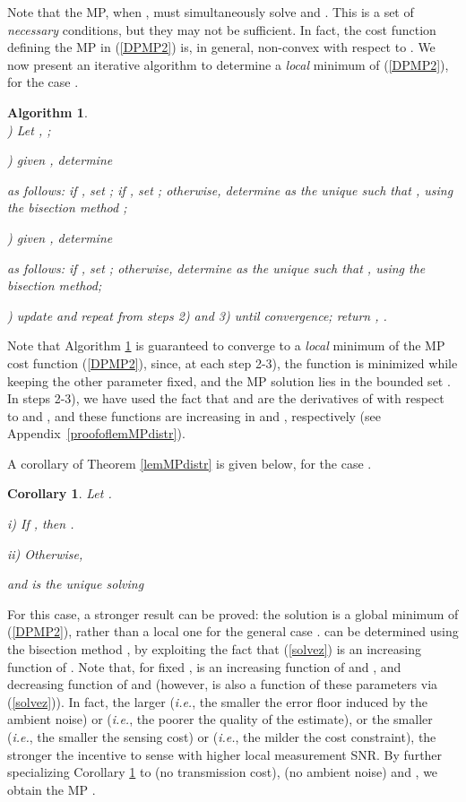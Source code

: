 \documentclass[10pt,twocolumn,twoside]{IEEEtran}
\newtheorem{corol}{Corollary}
\newtheorem{algo}{Algorithm}
\theoremstyle{plain}
\begin{document}
 Note that the MP, when , must simultaneously solve
   and 
 . This is a set of \emph{necessary} conditions, but they may not be sufficient.
 In fact, the cost function defining the MP in (\ref{DPMP2}) is, in general, non-convex with respect to .
 We now present an iterative algorithm to determine a \emph{local} minimum of (\ref{DPMP2}), for the case .
 \vspace{-3mm}
 \begin{algo}\label{algoMP}\\
) Let , ;

) given , determine

as follows: if , set ;
if , set ;
otherwise, determine  as the unique 
  such that , using the \emph{bisection method} \cite{bisection};
 
) given , determine

as follows: if , set ;
otherwise, determine  as the unique 
  such that , using the \emph{bisection method};

) update  and repeat from steps 2) and 3) until convergence; return ,
.
\end{algo}
Note that Algorithm \ref{algoMP} is guaranteed to converge to a \emph{local} minimum of the MP cost function (\ref{DPMP2}),
since, at each step 2-3), the function  is minimized while keeping the other parameter fixed, and
 the MP solution  lies in the bounded set .
In steps 2{-}3), we have used the fact that  and 
are the derivatives of   with respect to  and ,
and these functions are increasing in  and , respectively (see Appendix~\ref{proofoflemMPdistr}).

A corollary of Theorem \ref{lemMPdistr} is given below, for the case .
\begin{corol}
\label{sdfsdf}
Let .

\noindent \emph{i)} If ,
then .

\noindent \emph{ii)} 
Otherwise, 

and  is the unique  solving

\end{corol}
For this case, a stronger result can be proved: the solution is a global minimum of (\ref{DPMP2}), rather than a local one for the general case .
  can be determined using the bisection method \cite{bisection},
 by exploiting the fact that (\ref{solvez}) is an increasing function of .
 Note that, for fixed ,  is an increasing function of  and , and decreasing function of 
  and  (however,  is also a function of these parameters via (\ref{solvez})). In fact, the larger  (\emph{i.e.}, the smaller the
 error floor induced by the ambient noise) or
  (\emph{i.e.}, the poorer the quality of the estimate),
 or the smaller  (\emph{i.e.}, the smaller the sensing cost) or  (\emph{i.e.}, the milder the cost constraint),
 the stronger the incentive to sense with higher local measurement SNR.
By further specializing Corollary \ref{sdfsdf} to  (no transmission cost),  (no ambient noise) and , we obtain the
 MP \cite[Sec. II.B]{MichelusiP1}.
\end{document}

